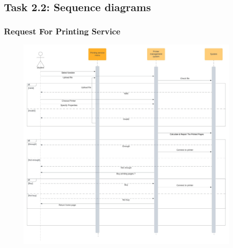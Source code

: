 \newpage
    \subsection{Task 2.2: Sequence diagrams}
    \subsubsection{Request For Printing Service}
    \begin{center}
    \begin{figure}[!htp]
    \begin{center}
     \includegraphics[scale=.19]{images/Task2/SequenceDiagrams/RequestForPrintingService.jpg}
    \end{center}
    \label{refhinh1}
    \end{figure}
    \end{center}

